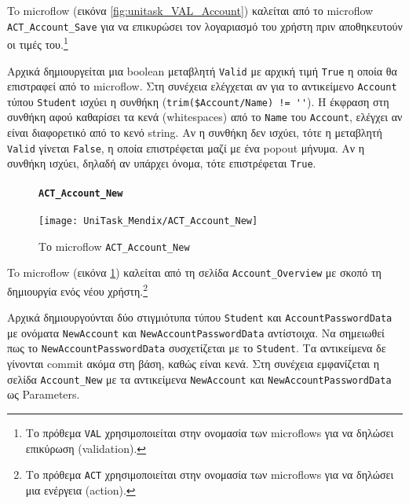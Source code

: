                     To microflow (εικόνα \ref{fig:unitask_VAL_Account}) καλείται από το microflow \texttt{ACT\_Account\_Save} για να επικυρώσει τον λογαριασμό του χρήστη πριν αποθηκευτούν οι τιμές του.\footnote{Το πρόθεμα \texttt{VAL} χρησιμοποιείται στην ονομασία των microflows για να δηλώσει επικύρωση (validation).}

                    Αρχικά δημιουργείται μια boolean μεταβλητή \texttt{Valid} με αρχική τιμή \texttt{True} η οποία θα επιστραφεί από το microflow. Στη συνέχεια ελέγχεται αν για το αντικείμενο \texttt{Account} τύπου \texttt{Student} ισχύει η συνθήκη (\verb|trim($Account/Name) != ''|). Η έκφραση στη συνθήκη αφού καθαρίσει τα κενά (whitespaces) από το \texttt{Name} του \texttt{Account}, ελέγχει αν είναι διαφορετικό από το κενό string. Αν η συνθήκη δεν ισχύει, τότε η μεταβλητή \texttt{Valid} γίνεται \texttt{False}, η οποία επιστρέφεται μαζί με ένα popout μήνυμα. Αν η συνθήκη ισχύει, δηλαδή αν υπάρχει όνομα, τότε επιστρέφεται \texttt{True}.

                \begin{figure}[H] \noindent
                    \paragraph{\texttt{ACT\_Account\_New}}
                    \begin{center}
                        \texttt{[image: UniTask\_Mendix/ACT\_Account\_New]}
                        \caption{\centering Το microflow \texttt{ACT\_Account\_New}}
                        \label{fig:unitask_ACT_Account_New}
                    \end{center}
                \end{figure}

                    To microflow (εικόνα \ref{fig:unitask_ACT_Account_New}) καλείται από τη σελίδα \texttt{Account\_Overview} με σκοπό τη δημιουργία ενός νέου χρήστη.\footnote{Το πρόθεμα \texttt{ACT} χρησιμοποιείται στην ονομασία των microflows για να δηλώσει μια ενέργεια (action).}

                    Αρχικά δημιουργούνται δύο στιγμιότυπα τύπου \texttt{Student} και \texttt{AccountPasswordData} με ονόματα \texttt{NewAccount} και \texttt{NewAccountPasswordData} αντίστοιχα. Να σημειωθεί πως το \texttt{NewAccountPasswordData} συσχετίζεται με το \texttt{Student}. Τα αντικείμενα δε γίνονται commit ακόμα στη βάση, καθώς είναι κενά. Στη συνέχεια εμφανίζεται η σελίδα \texttt{Account\_New} με τα αντικείμενα \texttt{NewAccount} και \texttt{NewAccountPasswordData} ως Parameters.

